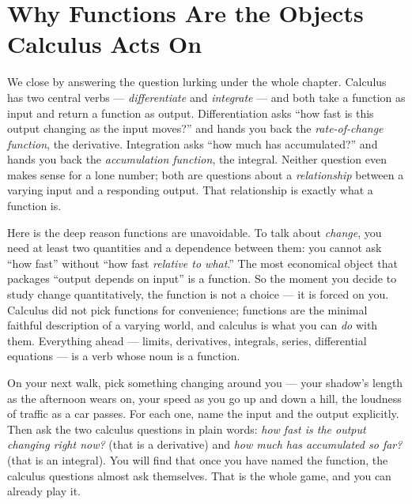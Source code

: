\section{Why Functions Are the Objects Calculus Acts On}
\label{ch02:why-functions}

We close by answering the question lurking under the whole chapter. Calculus has
two central verbs --- \emph{differentiate} and \emph{integrate} --- and both take a
function as input and return a function as output. Differentiation asks ``how fast
is this output changing as the input moves?'' and hands you back the
\emph{rate-of-change function}, the derivative. Integration asks ``how much has
accumulated?'' and hands you back the \emph{accumulation function}, the integral.
Neither question even makes sense for a lone number; both are questions about a
\emph{relationship} between a varying input and a responding output. That
relationship is exactly what a function is.

\begin{happeningbox}
Here is the deep reason functions are unavoidable. To talk about \emph{change}, you
need at least two quantities and a dependence between them: you cannot ask ``how
fast'' without ``how fast \emph{relative to what}.'' The most economical object
that packages ``output depends on input'' is a function. So the moment you decide
to study change quantitatively, the function is not a choice --- it is forced on
you. Calculus did not pick functions for convenience; functions are the minimal
faithful description of a varying world, and calculus is what you can \emph{do}
with them. Everything ahead --- limits, derivatives, integrals, series,
differential equations --- is a verb whose noun is a function.
\end{happeningbox}

\begin{walkbox}
On your next walk, pick something changing around you --- your shadow's length as
the afternoon wears on, your speed as you go up and down a hill, the loudness of
traffic as a car passes. For each one, name the input and the output explicitly.
Then ask the two calculus questions in plain words: \emph{how fast is the output
changing right now?} (that is a derivative) and \emph{how much has accumulated so
far?} (that is an integral). You will find that once you have named the function,
the calculus questions almost ask themselves. That is the whole game, and you can
already play it.
\end{walkbox}

